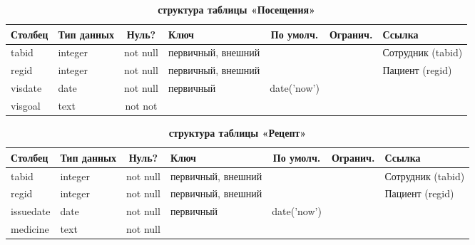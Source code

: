 \documentclass[14pt,a4paper,russian]{extreport}
\begin{document}
\begin{table}[h]
    \caption{ }
    \begin{subtable}[t]{\textwidth}
        \caption{\textbf{структура таблицы «Посещения»}}
    \begin{tabularx}{\textwidth}{| X | X | c | X | c | c | X |}
        \hline
        \textbf{Столбец} & \textbf{Тип данных} & \textbf{Нуль?} & \textbf{Ключ} & \textbf{По умолч.} & \textbf{Огранич.} & \textbf{Ссылка} \\ \hline
            tabid & integer & not null & первичный, внешний & & & Сотрудник (tabid) \\ \hline

            regid & integer & not null & первичный, внешний & & & Пациент (regid)\\ \hline
            visdate & date & not null & первичный & date('now') & & \\ \hline
            visgoal & text & not not & & & & \\ \hline
    \end{tabularx}
    \end{subtable}
    \label{table:visit}
\end{table}

\begin{table}[h]
    \caption{ } 
    \begin{subtable}[t]{\textwidth}
        \caption{\textbf{структура таблицы «Рецепт»}}
    \begin{tabularx}{\textwidth}{| X | X | c | X | c | c | X |}
        \hline
        \textbf{Столбец} & \textbf{Тип данных} & \textbf{Нуль?} & \textbf{Ключ} & \textbf{По
        умолч.} & \textbf{Огранич.} & \textbf{Ссылка} \\ \hline
            tabid & integer & not null & первичный, внешний & & & Сотрудник (tabid) \\ \hline

            regid & integer & not null & первичный, внешний & & & Пациент (regid)\\ \hline
            issuedate & date & not null & первичный & date('now') & & \\ \hline
        medicine & text & not null & & & & \\ \hline
    \end{tabularx}
    \end{subtable}
    \label{table:receipt}
\end{table}
\end{document}
